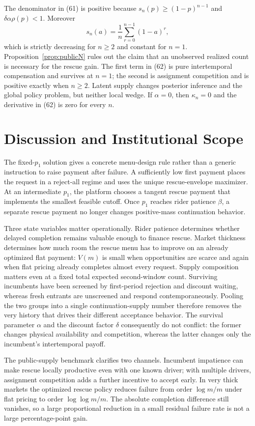 \documentclass[mnsc,blindrev]{informs3}
\begin{document}
The denominator in (61) is positive because
$s_n(p)\ge(1-p)^{n-1}$ and $\delta\alpha\rho(p)<1$.  Moreover
\[
 s_n(a)=\frac1n\sum_{r=0}^{n-1}(1-a)^r,
\]
which is strictly decreasing for $n\ge2$ and constant for $n=1$.
Proposition~\ref{prop:publicN} rules out the claim that an unobserved realized
count is necessary for the rescue gain.  The first term in (62) is pure
intertemporal compensation and survives at $n=1$; the second is assignment
competition and is positive exactly when $n\ge2$.  Latent supply changes
posterior inference and the global policy problem, but neither local wedge.
If $\alpha=0$, then $\kappa_n=0$ and the derivative in (62) is zero for
every $n$.

\section{Discussion and Institutional Scope}
\label{sec:discussion}

The fixed-$p_1$ solution gives a concrete menu-design rule rather than a
generic instruction to raise payment after failure.  A sufficiently low
first payment places the request in a reject-all regime and uses the unique
rescue-envelope maximizer.  At an intermediate $p_1$, the platform chooses a
tangent rescue payment that implements the smallest feasible cutoff.  Once
$p_1$ reaches rider patience $\beta$, a separate rescue payment no longer
changes positive-mass continuation behavior.

Three state variables matter operationally.  Rider patience determines
whether delayed completion remains valuable enough to finance rescue.  Market
thickness determines how much room the rescue menu has to improve on an
already optimized flat payment: $V(m)$ is small when opportunities are scarce
and again when flat pricing already completes almost every request.  Supply
composition matters even at a fixed total expected second-window count.
Surviving incumbents have been screened by first-period rejection and discount
waiting, whereas fresh entrants are unscreened and respond contemporaneously.
Pooling the two groups into a single continuation-supply number therefore
removes the very history that drives their different acceptance behavior.
The survival parameter $\alpha$ and the discount factor $\delta$ consequently
do not conflict: the former changes physical availability and competition,
whereas the latter changes only the incumbent's intertemporal payoff.

The public-supply benchmark clarifies two channels.  Incumbent impatience can
make rescue locally productive even with one known driver; with multiple
drivers, assignment competition adds a further incentive to accept early.
In very thick markets the optimized rescue policy reduces failure from order
$\log m/m$ under flat pricing to order $\log\log m/m$.  The absolute
completion difference still vanishes, so a large proportional reduction in a
small residual failure rate is not a large percentage-point gain.
\end{document}
